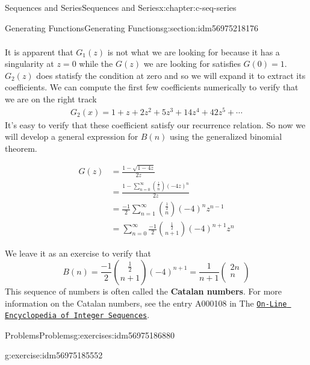 \documentclass[twoside,10pt,]{book}
\newcommand{\terminology}[1]{\textbf{#1}}
\numberwithin{equation}{section}
\begin{document}
\begin{chapterptx}{Sequences and Series}{}{Sequences and Series}{}{}{x:chapter:c-seq-series}
\begin{sectionptx}{Generating Functions}{}{Generating Functions}{}{}{g:section:idm56975218176}
\begin{gather}
\end{gather}
%
\par
It is apparent that \(G_1(z)\) is not what we are looking for because it has a singularity at \(z=0\) while the \(G(z)\) we are looking for satisfies \(G(0)=1\). \(G_2(z)\) does statisfy the condition at zero and so we will expand it to extract its coefficients.  We can compute the first few coefficients numerically to verify that we are on the right track%
\begin{gather}
G_2(x) = 1+z+2 z^2+5 z^3+14 z^4+42 z^5+\cdots\label{g:mrow:idm56975190832}
\end{gather}
It's easy to verify that these coefficient satisfy our recurrence relation.  So now we will develop a general expression for \(B(n)\) using the generalized binomial theorem.%
\par
%
\begin{equation*}
\begin{split}
G(z) &= \frac{1-\sqrt{1-4 z}}{2z}\\
&= \frac{1 - \sum_{n=0}^{\infty} \binom{\frac{1}{2}}{n} (-4z)^n}{2z}\\
&= \frac{-1}{2} \sum_{n=1}^{\infty} \binom{\frac{1}{2}}{n} (-4)^n z^{n-1}\\
&= \sum_{n=0}^{\infty} \frac{-1}{2} \binom{\frac{1}{2}}{n+1} (-4)^{n+1} z^n
\end{split}
\end{equation*}
%
\par
We leave it as an exercise to verify that%
\begin{equation*}
B(n) =\frac{-1}{2} \binom{\frac{1}{2}}{n+1} (-4)^{n+1}= \frac{1}{n+1}\left(
\begin{array}{c}
2n \\
n \\
\end{array}
\right)
\end{equation*}
This sequence of numbers is often called the \terminology{Catalan numbers}. For more information on the Catalan numbers, see the entry A000108 in The \href{https://oeis.org}{\nolinkurl{On-Line Encyclopedia of Integer Sequences}}.%
\end{sectionptx}
%
%
\typeout{************************************************}
\typeout{************************************************}
%
\begin{exercises-section}{Problems}{}{Problems}{}{}{g:exercises:idm56975186880}
\begin{divisionexercise}{1}{}{}{g:exercise:idm56975185552}%

\end{divisionexercise}
\end{exercises-section}
\end{chapterptx}
\end{document}
